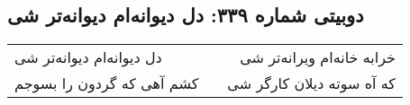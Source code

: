 \begin{center}
\section*{دوبیتی شماره ۳۳۹: دل دیوانه‌ام دیوانه‌تر شی}
\label{sec:339}
\begin{longtable}{l p{0.5cm} r}
دل دیوانه‌ام دیوانه‌تر شی
&&
خرابه خانه‌ام ویرانه‌تر شی
\\
کشم آهی که گردون را بسوجم
&&
که آه سوته دیلان کارگر شی
\\
\end{longtable}
\end{center}
